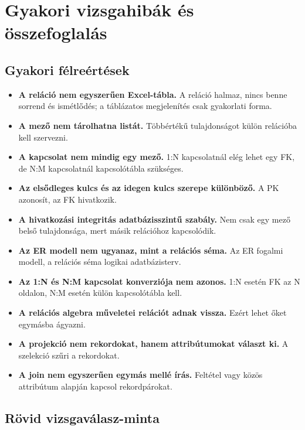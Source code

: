 \section{Gyakori vizsgahibák és összefoglalás}

\subsection{Gyakori félreértések}

\begin{itemize}
  \item \textbf{A reláció nem egyszerűen Excel-tábla.} A reláció halmaz, nincs benne sorrend és ismétlődés; a táblázatos megjelenítés csak gyakorlati forma.
  \item \textbf{A mező nem tárolhatna listát.} Többértékű tulajdonságot külön relációba kell szervezni.
  \item \textbf{A kapcsolat nem mindig egy mező.} 1:N kapcsolatnál elég lehet egy FK, de N:M kapcsolatnál kapcsolótábla szükséges.
  \item \textbf{Az elsődleges kulcs és az idegen kulcs szerepe különböző.} A PK azonosít, az FK hivatkozik.
  \item \textbf{A hivatkozási integritás adatbázisszintű szabály.} Nem csak egy mező belső tulajdonsága, mert másik relációhoz kapcsolódik.
  \item \textbf{Az ER modell nem ugyanaz, mint a relációs séma.} Az ER fogalmi modell, a relációs séma logikai adatbázisterv.
  \item \textbf{Az 1:N és N:M kapcsolat konverziója nem azonos.} 1:N esetén FK az N oldalon, N:M esetén külön kapcsolótábla kell.
  \item \textbf{A relációs algebra műveletei relációt adnak vissza.} Ezért lehet őket egymásba ágyazni.
  \item \textbf{A projekció nem rekordokat, hanem attribútumokat választ ki.} A szelekció szűri a rekordokat.
  \item \textbf{A join nem egyszerűen egymás mellé írás.} Feltétel vagy közös attribútum alapján kapcsol rekordpárokat.
\end{itemize}

\subsection{Rövid vizsgaválasz-minta}

